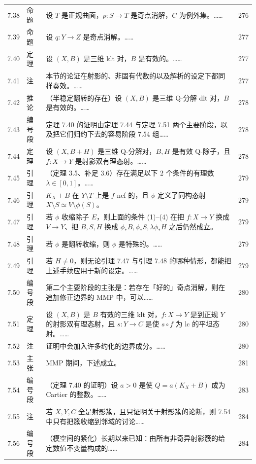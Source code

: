 \begin{longtable}{@{}p{}p{}p{}p{}@{}}
7.38 & 命题 & 设 $T$ 是正规曲面，$p\colon S\to T$ 是奇点消解，$C$ 为例外集。…… & 276 \\
7.39 & 命题 & 设 $q\colon Y\to Z$ 是奇点消解。…… & 277 \\
7.40 & 定理 & 设 $(X,B)$ 是三维 klt 对，$B$ 是有效的。…… & 277 \\
7.41 & 注 & 本节的论证在射影的、非固有代数的以及解析的设定下都同样奏效。…… & 277 \\
7.42 & 推论 & （半稳定翻转的存在）设 $(X,B)$ 是三维 Q-分解 dlt 对，$B$ 是有效的。…… & 278 \\
7.43 & 编号段 & 定理 7.40 的证明由定理 7.44 与定理 7.51 两个主要阶段，以及把它们归约下去的容易阶段 7.54 组…… & 278 \\
7.44 & 定理 & 设 $(X,B+H)$ 是三维 Q-分解对，$B,H$ 是有效 Q-除子，且 $f\colon X\to Y$ 是射影双有理态射。…… & 278 \\
7.45 & 引理 & （定理 3.5、补足 3.6）存在满足以下 2 个条件的有理数 $\lambda\in[0,1]$。…… & 279 \\
7.46 & 引理 & $K_X+B$ 在 $Y\setminus T$ 上是 $f$-nef 的，且 $\phi$ 定义了同构态射 $X\setminus S\simeq V\setminus\phi(S)$。 & 279 \\
7.47 & 引理 & 若 $\phi$ 收缩除子 $E$，则上面的条件 (1)–(4) 在把 $f\colon X\to Y$ 换成 $V\to Y$、把 $B,S,H$ 换成 $\phi_*B,\phi_*S,\lambda\phi_*H$ 之后仍然成立。 & 279 \\
7.48 & 引理 & 若 $\phi$ 是翻转收缩，则 $\phi$ 是特殊的。…… & 279 \\
7.49 & 引理 & 若 $H\ne0$，则无论引理 7.47 与引理 7.48 的哪种情形，都能把上述手续应用于新的设定。…… & 279 \\
7.50 & 编号段 & 第二个主要阶段的主张是：若存在「好的」奇点消解，则在追加修正边界的 MMP 中，可以…… & 280 \\
7.51 & 定理 & 设 $(X,B)$ 是 $B$ 有效的三维 klt 对，$f\colon X\to Y$ 是到正规 $Y$ 的射影双有理态射，且 $s\colon Y\to C$ 是使 $s\circ f$ 为 lc 的平坦态射。…… & 280 \\
7.52 & 注 & 证明中会加入许多约化的边界成分。…… & 280 \\
7.53 & 主张 & MMP 期间，下述成立。 & 281 \\
7.54 & 编号段 & （定理 7.40 的证明）\quad 设 $a>0$ 是使 $Q=a(K_X+B)$ 成为 Cartier 的整数。…… & 283 \\
7.55 & 注 & 若 $X,Y,C$ 全是射影簇，且只证明关于射影簇的论断，则 7.54 中只有把簇收缩到邻域的讨论…… & 284 \\
7.56 & 编号段 & （模空间的紧化）\quad 长期以来已知：由所有非奇异射影簇的给定数值不变量构成的…… & 284 \\

\end{longtable}
